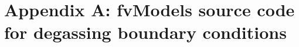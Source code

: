 \documentclass[11pt,a4paper]{article}
\begin{document}
\clearpage


\appendix
\section{Appendix A: fvModels source code for degassing boundary conditions}
\label{app:A}



\cleardoublepage
\end{document}
